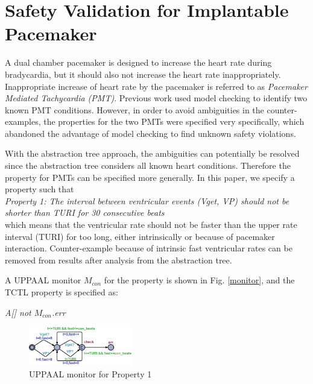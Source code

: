\section{Safety Validation for Implantable Pacemaker}
A dual chamber pacemaker is designed to increase the heart rate during bradycardia, but it should also not increase the heart rate inappropriately.
Inappropriate increase of heart rate by the pacemaker is referred to as \emph{Pacemaker Mediated Tachycardia (PMT)}.
Previous work \cite{sttt13} used model checking to identify two known PMT conditions.
However, in order to avoid ambiguities in the counter-examples, the properties for the two PMTs were specified very specifically, which abandoned the advantage of model checking to find unknown safety violations.

With the abstraction tree approach, the ambiguities can potentially be resolved since the abstraction tree considers all known heart conditions.
Therefore the property for PMTs can be specified more generally.
In this paper, we specify a property such that\\
\emph{Property 1: The interval between ventricular events (Vget, VP) should not be shorter than TURI for 30 consecutive beats}\\
which means that the ventricular rate should not be faster than the upper rate interval (TURI) for too long, either intrinsically or because of pacemaker interaction.
Counter-example because of intrinsic fast ventricular rates can be removed from results after analysis from the abstraction tree.

A UPPAAL monitor $M_{con}$ for the property is shown in Fig. \ref{monitor}, and the TCTL property is specified as:\\
\begin{center}
\emph{A[] not $M_{con}$.err}
\end{center}

\begin{figure}[!t]
	\centering
	\includegraphics[width=0.4\textwidth]{figs/monitor.png}
	\vspace{-10pt}
	\caption{\small UPPAAL monitor for Property 1}
	\vspace{-10pt}
	\label{fig:monitor}
\end{figure}

